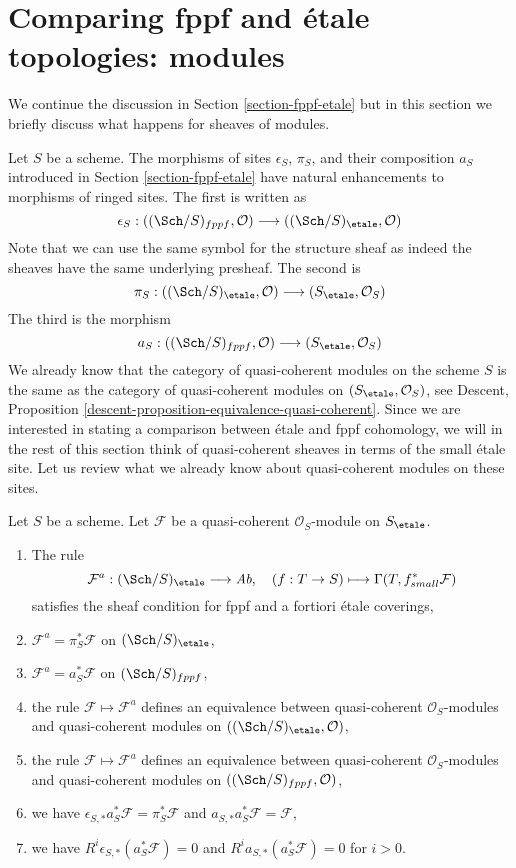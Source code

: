 \section{Comparing fppf and \'etale topologies: modules}
\label{section-fppf-etale-modules}

\noindent
We continue the discussion in Section \ref{section-fppf-etale} but in this
section we briefly discuss what happens for sheaves of modules.

\medskip\noindent
Let $S$ be a scheme. The morphisms of sites $\epsilon_S$, $\pi_S$, and
their composition $a_S$ introduced in Section \ref{section-fppf-etale}
have natural enhancements to morphisms of ringed sites. The first
is written as
$$
\epsilon_S :
((\Sch/S)_{fppf}, \mathcal{O})
\longrightarrow
((\Sch/S)_\etale, \mathcal{O})
$$
Note that we can use the same symbol for the structure sheaf as indeed
the sheaves have the same underlying presheaf. The second is
$$
\pi_S :
((\Sch/S)_\etale, \mathcal{O})
\longrightarrow
(S_\etale, \mathcal{O}_S)
$$
The third is the morphism
$$
a_S :
((\Sch/S)_{fppf}, \mathcal{O})
\longrightarrow
(S_\etale, \mathcal{O}_S)
$$
We already know that the category of quasi-coherent modules on the
scheme $S$ is the same as the category of quasi-coherent modules
on $(S_\etale, \mathcal{O}_S)$, see
Descent, Proposition \ref{descent-proposition-equivalence-quasi-coherent}.
Since we are interested in stating a comparison between
\'etale and fppf cohomology, we will in the rest of this
section think of quasi-coherent sheaves in terms of the
small \'etale site.
Let us review what we already know about quasi-coherent
modules on these sites.

\begin{lemma}
\label{lemma-review-quasi-coherent}
Let $S$ be a scheme. Let $\mathcal{F}$ be a quasi-coherent
$\mathcal{O}_S$-module on $S_\etale$.
\begin{enumerate}
\item The rule
$$
\mathcal{F}^a : (\Sch/S)_\etale \longrightarrow \textit{Ab},\quad
(f : T \to S) \longmapsto \Gamma(T, f_{small}^*\mathcal{F})
$$
satisfies the sheaf condition for fppf and a fortiori \'etale coverings,
\item $\mathcal{F}^a = \pi_S^*\mathcal{F}$ on $(\Sch/S)_\etale$,
\item $\mathcal{F}^a = a_S^*\mathcal{F}$ on $(\Sch/S)_{fppf}$,
\item the rule $\mathcal{F} \mapsto \mathcal{F}^a$ defines
an equivalence between quasi-coherent $\mathcal{O}_S$-modules
and quasi-coherent modules on
$((\Sch/S)_\etale, \mathcal{O})$,
\item the rule $\mathcal{F} \mapsto \mathcal{F}^a$ defines
an equivalence between quasi-coherent $\mathcal{O}_S$-modules
and quasi-coherent modules on
$((\Sch/S)_{fppf}, \mathcal{O})$,
\item we have $\epsilon_{S, *}a_S^*\mathcal{F} = \pi_S^*\mathcal{F}$
and $a_{S, *}a_S^*\mathcal{F} = \mathcal{F}$,
\item we have $R^i\epsilon_{S, *}(a_S^*\mathcal{F}) = 0$
and $R^ia_{S, *}(a_S^*\mathcal{F}) = 0$ for $i > 0$.
\end{enumerate}
\end{lemma}

